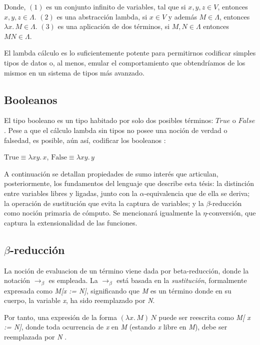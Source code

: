 Donde, $(1)$ es un conjunto infinito de variables, tal que si $x, y, z \in \textit{V}$, entonces $x, y, z \in \Lambda$. $(2)$ es una abstracción lambda, si $x \in V$ y además $M \in \Lambda$, entonces $\lambda x.\, M \in \Lambda $. $(3)$ es una aplicación de dos términos, si $M, N \in \Lambda$ entonces $M N \in \Lambda$.

El lambda cálculo es lo suficientemente potente para permitirnos codificar simples tipos de datos o, al menos, emular el comportamiento que obtendríamos de los mismos en un sistema de tipos más avanzado.

\subsection{Booleanos}
El tipo booleano es un tipo habitado por solo dos posibles términos: $True$ o $False$. Pese a que el cálculo lambda sin tipos no posee una noción de verdad o falsedad, es posible, aún así, codificar los booleanos \citep{barendregt1984}:

\begin{example}
  $\mathrm{True} \equiv \lambda xy.\, x$, \quad $\mathrm{False} \equiv \lambda xy.\, y$
\end{example}

A continuación se detallan propiedades de sumo interés que articulan, posteriormente, los fundamentos del lenguaje que describe esta tésis: la distinción entre variables libres y ligadas, junto con la $\alpha$-equivalencia que de ella se deriva; la operación de sustitución que evita la captura de variables; y la $\beta$-reducción como noción primaria de cómputo. Se mencionará igualmente la $\eta$-conversión, que captura la extensionalidad de las funciones.

\subsection{$\beta$-reducción}
La noción de evaluacion de un término viene dada por beta-reducción, donde la notación $\to_\beta$ es empleada. La $\to_\beta$ está basada en la \textit{sustitución}, formalmente expresada como \textit{M[x := N]}, significando que \textit{M} es un término donde en su cuerpo, la variable \textit{x}, ha sido reemplazado por \textit{N}.

Por tanto, una expresión de la forma $(\lambda x.\, M)\, N$ puede ser reescrita como \textit{M[ x := N]}, donde toda ocurrencia de \textit{x} en \textit{M} (estando \textit{x} libre en \textit{M}), debe ser reemplazada por \textit{N} \citep{geuvers2014}.

